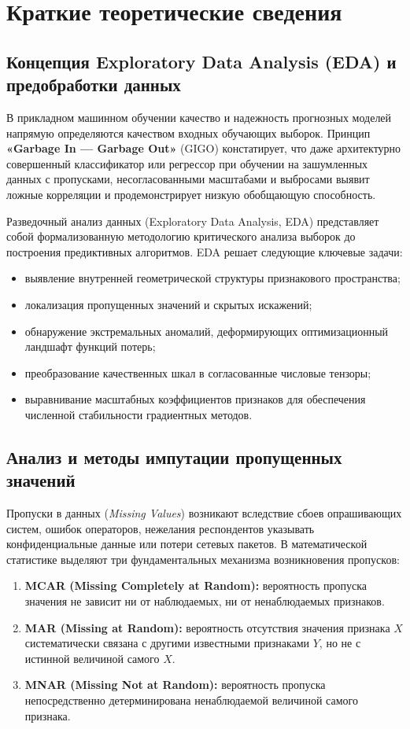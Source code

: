 \documentclass[14pt,a4paper]{extarticle}
\begin{document}
\section{Краткие теоретические сведения}

\subsection{Концепция Exploratory Data Analysis (EDA) и предобработки данных}

В прикладном машинном обучении качество и надежность прогнозных моделей напрямую определяются качеством входных обучающих выборок. Принцип \textbf{«Garbage In --- Garbage Out»} (GIGO) констатирует, что даже архитектурно совершенный классификатор или регрессор при обучении на зашумленных данных с пропусками, несогласованными масштабами и выбросами выявит ложные корреляции и продемонстрирует низкую обобщающую способность.

Разведочный анализ данных (Exploratory Data Analysis, EDA) представляет собой формализованную методологию критического анализа выборок до построения предиктивных алгоритмов. EDA решает следующие ключевые задачи:
\begin{itemize}
    \item выявление внутренней геометрической структуры признакового пространства;
    \item локализация пропущенных значений и скрытых искажений;
    \item обнаружение экстремальных аномалий, деформирующих оптимизационный ландшафт функций потерь;
    \item преобразование качественных шкал в согласованные числовые тензоры;
    \item выравнивание масштабных коэффициентов признаков для обеспечения численной стабильности градиентных методов.
\end{itemize}

\subsection{Анализ и методы импутации пропущенных значений}

Пропуски в данных (\textit{Missing Values}) возникают вследствие сбоев опрашивающих систем, ошибок операторов, нежелания респондентов указывать конфиденциальные данные или потери сетевых пакетов. В математической статистике выделяют три фундаментальных механизма возникновения пропусков:
\begin{enumerate}
    \item \textbf{MCAR (Missing Completely at Random):} вероятность пропуска значения не зависит ни от наблюдаемых, ни от ненаблюдаемых признаков.
    \item \textbf{MAR (Missing at Random):} вероятность отсутствия значения признака $X$ систематически связана с другими известными признаками $Y$, но не с истинной величиной самого $X$.
    \item \textbf{MNAR (Missing Not at Random):} вероятность пропуска непосредственно детерминирована ненаблюдаемой величиной самого признака.
\end{enumerate}
\end{document}
